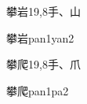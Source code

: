\begin{Entry}{攀岩}{19,8}{⼿、⼭}
  \begin{Phonetics}{攀岩}{pan1yan2}
  \end{Phonetics}
\end{Entry}

\begin{Entry}{攀爬}{19,8}{⼿、⽖}
  \begin{Phonetics}{攀爬}{pan1pa2}
  \end{Phonetics}
\end{Entry}


